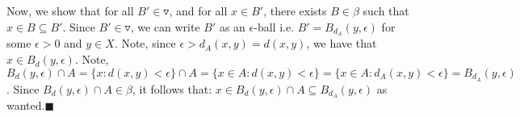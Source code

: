 \documentclass{article}
\begin{document}
    Now, we show that for all $B'\in\triangledown$, and for all $x\in B'$, there exists $B\in\beta$ such that $x\in B\subseteq B'$. Since $B'\in\triangledown$,
    we can write $B'$ as an $\epsilon$-ball i.e. $B' = B_{d_A}(y,\epsilon)$ for some $\epsilon>0$ and $y\in X$. Note, since $\epsilon > d_A(x,y) = d(x,y)$, we have
    that $x\in B_d(y,\epsilon)$. Note, $B_d(y,\epsilon) \cap A = \{x: d(x,y) < \epsilon\} \cap A = 
    \{ x\in A: d(x,y) < \epsilon\} = \{ x\in A: d_A(x,y) < \epsilon\} = B_{d_A}(y,\epsilon)$. Since $B_d(y,\epsilon)\cap A\in\beta$, it follows that:
    $x\in B_d(y,\epsilon) \cap A \subseteq B_{d_A}(y,\epsilon)$ as wanted.\hfill$\blacksquare$\\
\end{document}
